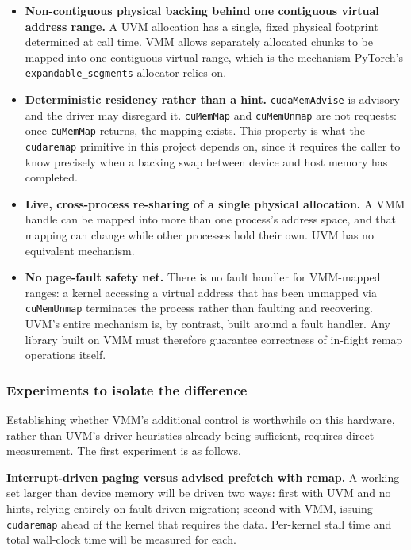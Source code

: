 \begin{itemize}
  \item \textbf{Non-contiguous physical backing behind one contiguous
    virtual address range.} A UVM allocation has a single, fixed physical
    footprint determined at call time. VMM allows separately allocated
    chunks to be mapped into one contiguous virtual range, which is the
    mechanism PyTorch's \texttt{expandable\_segments} allocator relies on.
  \item \textbf{Deterministic residency rather than a hint.}
    \texttt{cudaMemAdvise} is advisory and the driver may disregard it.
    \texttt{cuMemMap} and \texttt{cuMemUnmap} are not requests: once
    \texttt{cuMemMap} returns, the mapping exists. This property is what the
    \texttt{cudaremap} primitive in this project depends on, since it
    requires the caller to know precisely when a backing swap between
    device and host memory has completed.
  \item \textbf{Live, cross-process re-sharing of a single physical
    allocation.} A VMM handle can be mapped into more than one process's
    address space, and that mapping can change while other processes hold
    their own. UVM has no equivalent mechanism.
  \item \textbf{No page-fault safety net.} There is no fault handler for
    VMM-mapped ranges: a kernel accessing a virtual address that has been
    unmapped via \texttt{cuMemUnmap} terminates the process rather than
    faulting and recovering. UVM's entire mechanism is, by contrast, built
    around a fault handler. Any library built on VMM must therefore
    guarantee correctness of in-flight remap operations itself.
\end{itemize}


\subsubsection{Experiments to isolate the difference}


Establishing whether VMM's additional control is worthwhile on this
hardware, rather than UVM's driver heuristics already being sufficient,
requires direct measurement. The first experiment is as follows.

\textbf{Interrupt-driven paging versus advised prefetch with remap.} A
working set larger than device memory will be driven two ways: first with
UVM and no hints, relying entirely on fault-driven migration; second with
VMM, issuing \texttt{cudaremap} ahead of the kernel that requires the data.
Per-kernel stall time and total wall-clock time will be measured for each.

